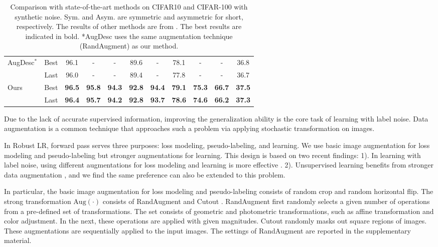 \documentclass[letterpaper]{article} \usepackage{aaai23}  \usepackage{times}  \usepackage{helvet}  \usepackage{courier}  \usepackage[hyphens]{url}  \usepackage{graphicx} \urlstyle{rm} \def\UrlFont{\rm}  \usepackage{natbib}  \usepackage{caption} \frenchspacing  \setlength{\pdfpagewidth}{8.5in} \setlength{\pdfpageheight}{11in} \usepackage{algorithm}
\begin{document}
\begin{table*}
\begin{tabular}{lr|c|c|c|c|c||c|c|c|c}
		\multirow{2}{*}{AugDesc$^*$ \cite{nishi2021augmentation}}        & Best  & 96.1 &  -   &   -  & 89.6 &  -   & 78.1 &  -   &  -   & 36.8 \\
				                               & Last  & 96.0 &  -   &   -  & 89.4 &  -   & 77.8 &  -   &  -   & 36.7 \\\midrule
		\multirow{2}{*}{Ours}            & Best & \textbf{96.5} & \textbf{95.8} & \textbf{94.3} & \textbf{92.8} & \textbf{94.4} & \textbf{79.1} & \textbf{75.3} & \textbf{66.7} &  \textbf{37.5} \\
				              & Last & \textbf{96.4} & \textbf{95.7} & \textbf{94.2} & \textbf{92.8} & \textbf{93.7} & \textbf{78.6} & \textbf{74.6} & \textbf{66.2} & \textbf{37.3} \\
        \bottomrule
    \end{tabular}
    \caption{Comparison with state-of-the-art methods on CIFAR10 and CIFAR-100 with synthetic noise. Sym. and Asym. are symmetric and asymmetric for short, respectively. 
    The results of other methods are from \cite{li2020dividemix}.
    The best results are indicated in bold. *AugDesc uses the same augmentation technique (RandAugment) as our method.}
    \label{table_CIFAR}
\end{table*}


Due to the lack of accurate supervised information, improving the generalization ability is the core task of learning with label noise.
Data augmentation is a common technique that approaches such a problem via applying stochastic transformation on images.

In Robust LR, forward pass serves three purposes: loss modeling, pseudo-labeling, and learning.
We use basic image augmentation for loss modeling and pseudo-labeling but stronger augmentations for learning.
This design is based on two recent findings:
1). In learning with label noise, using different augmentations for loss modeling and learning is more effective \cite{nishi2021augmentation}.
2). Unsupervised learning benefits from stronger data augmentation \cite{chen2020simple}, and we find the same preference can also be extended to this problem.

In particular, the basic image augmentation for loss modeling and pseudo-labeling consists of random crop and random horizontal flip.
The strong transformation $\text{Aug}(\cdot)$ consists of RandAugment \cite{cubuk2020randaugment} and Cutout \cite{devries2017improved}. 
RandAugment first randomly selects a given number of operations from a pre-defined set of transformations.
The set consists of geometric and photometric transformations, such as affine transformation and color adjustment. 
In the next, these operations are applied with given magnitudes.
Cutout randomly masks out square regions of images.
These augmentations are sequentially applied to the input images.
The settings of RandAugment are reported in the supplementary material.
\end{document}
